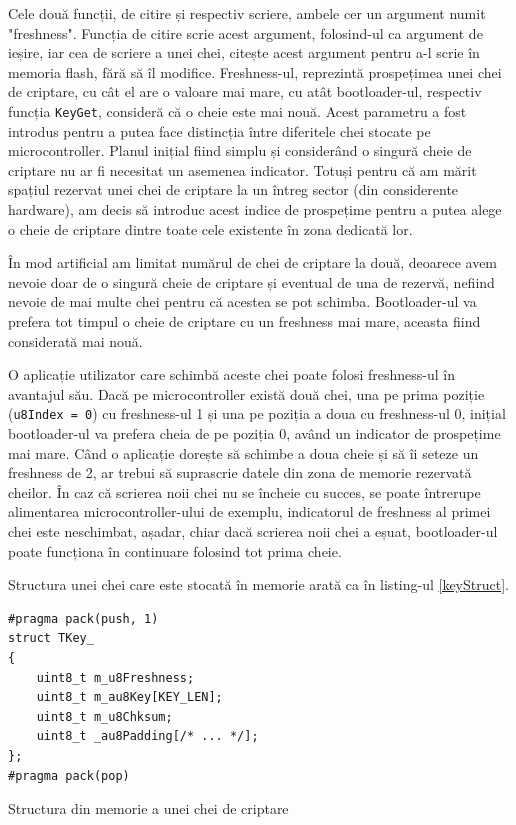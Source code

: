 \documentclass[12pt,a4paper,titlepage]{report}
\begin{document}
Cele două funcții, de citire și respectiv scriere, ambele cer un argument numit "freshness". Funcția de citire scrie acest argument, folosind-ul ca argument de ieșire, iar cea de scriere a unei chei, citește acest argument pentru a-l scrie în memoria flash, fără să îl modifice. Freshness-ul, reprezintă prospețimea unei chei de criptare, cu cât el are o valoare mai mare, cu atât bootloader-ul, respectiv funcția \texttt{KeyGet}, consideră că o cheie este mai nouă. Acest parametru a fost introdus pentru a putea face distincția între diferitele chei stocate pe microcontroller.
Planul inițial fiind simplu și considerând o singură cheie de criptare nu ar fi necesitat un asemenea indicator. Totuși pentru că am mărit spațiul rezervat unei chei de criptare la un întreg sector (din considerente hardware), am decis să introduc acest indice de prospețime pentru a putea alege o cheie de criptare dintre toate cele existente în zona dedicată lor.

În mod artificial am limitat numărul de chei de criptare la două, deoarece avem nevoie doar de o singură cheie de criptare și eventual de una de rezervă, nefiind nevoie de mai multe chei pentru că acestea se pot schimba. Bootloader-ul va prefera tot timpul o cheie de criptare cu un freshness mai mare, aceasta fiind considerată mai nouă.

O aplicație utilizator care schimbă aceste chei poate folosi freshness-ul în avantajul său. Dacă pe microcontroller există două chei, una pe prima poziție (\texttt{u8Index = 0}) cu freshness-ul 1 și una pe poziția a doua cu freshness-ul 0, inițial bootloader-ul va prefera cheia de pe poziția 0, având un indicator de prospețime mai mare. Când o aplicație dorește să schimbe a doua cheie și să îi seteze un freshness de 2, ar trebui să suprascrie datele din zona de memorie rezervată cheilor. În caz că scrierea noii chei nu se încheie cu succes, se poate întrerupe alimentarea microcontroller-ului de exemplu, indicatorul de freshness al primei chei este neschimbat, așadar, chiar dacă scrierea noii chei a eșuat, bootloader-ul poate funcționa în continuare folosind tot prima cheie.

Structura unei chei care este stocată în memorie arată ca în listing-ul \ref{keyStruct}.

\begin{listing}[h]
\begin{verbatim}
#pragma pack(push, 1)
struct TKey_
{
    uint8_t m_u8Freshness;
    uint8_t m_au8Key[KEY_LEN];
    uint8_t m_u8Chksum;
    uint8_t _au8Padding[/* ... */];
};
#pragma pack(pop)
\end{verbatim}

\caption{Structura din memorie a unei chei de criptare}
\label{keyStruct}
\end{listing}
\end{document}
